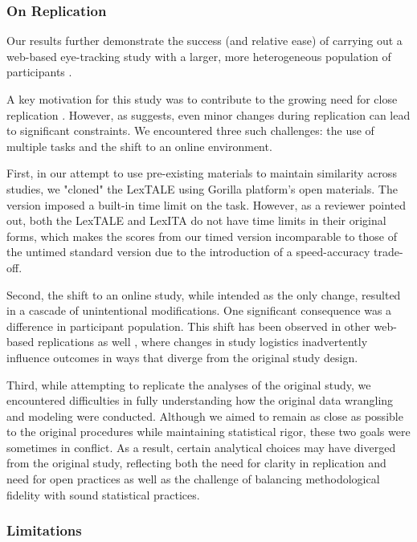 \subsubsection{On Replication}
Our results further demonstrate the success (and relative ease) of carrying out a web-based eye-tracking study with a larger, more heterogeneous population of participants \citep{Vos_2017, bramlett_wiener_24-AOW}.

A key motivation for this study was to contribute to the growing need for close replication \citep{Marsden_2018}. However, as \cite{mcmanus2022replication} suggests, even minor changes during replication can lead to significant constraints. We encountered three such challenges: the use of multiple tasks and the shift to an online environment.

First, in our attempt to use pre-existing materials to maintain similarity across studies, we "cloned" the LexTALE using Gorilla platform’s open materials. The version imposed a built-in time limit on the task. However, as a reviewer pointed out, both the LexTALE and LexITA do not have time limits in their original forms, which makes the scores from our timed version incomparable to those of the untimed standard version due to the introduction of a speed-accuracy trade-off.

Second, the shift to an online study, while intended as the only change, resulted in a cascade of unintentional modifications. One significant consequence was a difference in participant population. This shift has been observed in other web-based replications as well \citep{bramlett_wiener_24-AOW}, where changes in study logistics inadvertently influence outcomes in ways that diverge from the original study design.

Third, while attempting to replicate the analyses of the original study, we encountered difficulties in fully understanding how the original data wrangling and modeling were conducted. Although we aimed to remain as close as possible to the original procedures while maintaining statistical rigor, these two goals were sometimes in conflict. As a result, certain analytical choices may have diverged from the original study, reflecting both the need for clarity in replication and need for open practices as well as the challenge of balancing methodological fidelity with sound statistical practices.

\subsubsection{Limitations}

